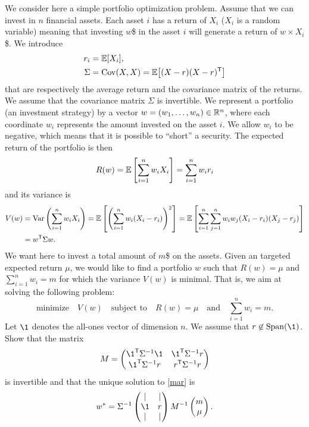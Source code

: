 \documentclass[11pt,nocut]{article}
\begin{document}
\begin{problem}[$\star$]
	We consider here a simple portfolio optimization problem.
	Assume that we can invest in $n$ financial assets. Each asset $i$ has a return of $X_i$ ($X_i$ is a random variable) meaning that investing $w$\$ in the asset $i$ will generate a return of $w \times X_i$ \$. We introduce
	\begin{align*}
		r_i &= \mathbb{E}[X_i], \\
		\Sigma &= {{\rm Cov}}(X,X) = \mathbb{E}\big[(X-r) (X-r)^{{\sf T}}\big]
	\end{align*}
	that are respectively the average return and the covariance matrix of the returns. 
	We assume that the covariance matrix $\Sigma$ is invertible. We represent a portfolio (an investment strategy) by a vector $w = (w_1, \dots, w_n) \in \mathbb{R}^n$, where each coordinate $w_i$ represents the amount invested on the asset $i$. 
	We allow $w_i$ to be negative, which means that it is possible to ``short'' a security.
	The expected return of the portfolio is then
	$$
	R(w) = \mathbb{E} \left[\sum_{i=1}^n w_i X_i\right] = \sum_{i=1}^n w_i r_i
	$$
	and its variance is
	\begin{align*}
	V(w) 
	&= {{\rm Var}} \left(\sum_{i=1}^n w_i X_i\right) 
	= \mathbb{E} \left[\left(\sum_{i=1}^n w_i (X_i -r_i)\right)^2\right]
	= \mathbb{E} \left[\sum_{i=1}^n\sum_{j=1}^n w_iw_j (X_i -r_i)(X_j -r_j)\right]
	\\
	&= w^{{\sf T}} \Sigma w.
	\end{align*}
	We want here to invest a total amount of $m$\$ on the assets. 
	Given an targeted expected return $\mu$, we would like to find a portfolio $w$ such that $R(w)=\mu$ and $\sum_{i=1}^n w_i = m$ for which the variance $V(w)$ is minimal.
	That is, we aim at solving the following problem:
	\begin{equation}\label{mar}
		\text{minimize} \quad
		V(w) \quad \text{subject to} \quad
		R(w) = \mu \quad \text{and} \quad \sum_{i=1}^n w_i = m.
	\end{equation}
	Let $\1$ denotes the all-ones vector of dimension $n$. We assume that $r \not\in \Span(\1)$.
	Show that the matrix
	$$
	M = 
	\begin{pmatrix}
		\1^{\sT} \Sigma^{-1} \1 & \1^{\sT} \Sigma^{-1} r \\
		\1^{\sT} \Sigma^{-1} r & r^{\sT} \Sigma^{-1} r
	\end{pmatrix}
	$$
	is invertible and that the unique solution to \eqref{mar} is
	$$
	w^* = \Sigma^{-1} 
	\begin{pmatrix}
		| & | \\
		\1 & r \\
		| & |
	\end{pmatrix}
	M^{-1} 
	\begin{pmatrix}
		m \\
		\mu
	\end{pmatrix}.
	$$
\end{problem}



\vspace{1cm}
\centerline{}

%
%
\end{document}

